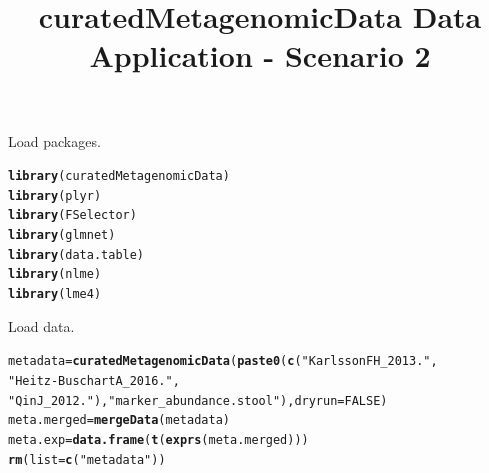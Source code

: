\documentclass{article}\usepackage[]{graphicx}\usepackage[]{color}
\makeatletter
\newcommand{\hlnum}[1]{\textcolor[rgb]{0.686,0.059,0.569}{#1}}%
\newcommand{\hlstr}[1]{\textcolor[rgb]{0.192,0.494,0.8}{#1}}%
\newcommand{\hlstd}[1]{\textcolor[rgb]{0.345,0.345,0.345}{#1}}%
\newcommand{\hlkwb}[1]{\textcolor[rgb]{0.69,0.353,0.396}{#1}}%
\newcommand{\hlkwc}[1]{\textcolor[rgb]{0.333,0.667,0.333}{#1}}%
\newcommand{\hlkwd}[1]{\textcolor[rgb]{0.737,0.353,0.396}{\textbf{#1}}}%
\newenvironment{kframe}{%
 \def\at@end@of@kframe{}%
 \ifinner\ifhmode%
  \def\at@end@of@kframe{\end{minipage}}%
  \begin{minipage}{\columnwidth}%
 \fi\fi%
 \def\FrameCommand##1{\hskip\@totalleftmargin \hskip-\fboxsep
 \colorbox{shadecolor}{##1}\hskip-\fboxsep
     \hskip-\linewidth \hskip-\@totalleftmargin \hskip\columnwidth}%
 \MakeFramed {\advance\hsize-\width
   \@totalleftmargin\z@ \linewidth\hsize
   \@setminipage}}%
 {\par\unskip\endMakeFramed%
 \at@end@of@kframe}
\newenvironment{knitrout}{}{} %
\makeatother
\begin{document}
\title{curatedMetagenomicData Data Application - Scenario 2}
\date{}
\maketitle

Load packages.
\begin{knitrout}
\color{fgcolor}\begin{kframe}
\begin{alltt}
\hlkwd{library}\hlstd{(curatedMetagenomicData)}
\hlkwd{library}\hlstd{(plyr)}
\hlkwd{library}\hlstd{(FSelector)}
\hlkwd{library}\hlstd{(glmnet)}
\hlkwd{library}\hlstd{(data.table)}
\hlkwd{library}\hlstd{(nlme)}
\hlkwd{library}\hlstd{(lme4)}
\end{alltt}
\end{kframe}
\end{knitrout}

Load data.
\begin{knitrout}
\color{fgcolor}\begin{kframe}
\begin{alltt}
\hlstd{metadata} \hlkwb{=} \hlkwd{curatedMetagenomicData}\hlstd{(}\hlkwd{paste0}\hlstd{(}\hlkwd{c}\hlstd{(}\hlstr{"KarlssonFH_2013."}\hlstd{,}
                          \hlstr{"Heitz-BuschartA_2016."}\hlstd{,}
                          \hlstr{"QinJ_2012."}\hlstd{),} \hlstr{"marker_abundance.stool"}\hlstd{),} \hlkwc{dryrun} \hlstd{=} \hlnum{FALSE}\hlstd{)}
\hlstd{meta.merged} \hlkwb{=} \hlkwd{mergeData}\hlstd{(metadata)}
\hlstd{meta.exp} \hlkwb{=} \hlkwd{data.frame}\hlstd{(}\hlkwd{t}\hlstd{(}\hlkwd{exprs}\hlstd{(meta.merged)))}
\hlkwd{rm}\hlstd{(}\hlkwc{list}\hlstd{=}\hlkwd{c}\hlstd{(}\hlstr{"metadata"}\hlstd{))}
\end{alltt}
\end{kframe}
\end{knitrout}
\end{document}
